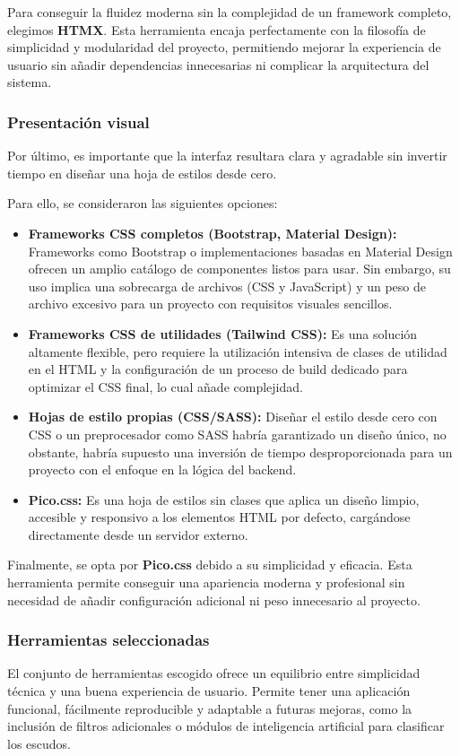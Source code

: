 Para conseguir la fluidez moderna sin la complejidad de un framework completo, elegimos \textbf{HTMX}. Esta herramienta 
encaja perfectamente con la filosofía de simplicidad y modularidad del proyecto, permitiendo mejorar la 
experiencia de usuario sin añadir dependencias innecesarias ni complicar la arquitectura del sistema.

\subsubsection{Presentación visual}
Por último, es importante que la interfaz resultara clara y agradable sin invertir tiempo en diseñar una 
hoja de estilos desde cero.  

Para ello, se consideraron las siguientes opciones:

\begin{itemize} 
    \item \textbf{Frameworks CSS completos (Bootstrap, Material Design):} Frameworks como Bootstrap o 
    implementaciones basadas en Material Design ofrecen un amplio catálogo de componentes listos para 
    usar. Sin embargo, su uso implica una sobrecarga de archivos (CSS y JavaScript) y un peso de 
    archivo excesivo para un proyecto con requisitos visuales sencillos. 
    \item \textbf{Frameworks CSS de utilidades (Tailwind CSS):} Es una solución altamente flexible, pero
    requiere la utilización intensiva de clases de utilidad en el HTML y la configuración de un proceso de build
    dedicado para optimizar el CSS final, lo cual añade complejidad. 
    \item \textbf{Hojas de estilo propias (CSS/SASS):} Diseñar el estilo desde cero con CSS o un 
    preprocesador como SASS habría garantizado un diseño único, no obstante, habría supuesto una inversión de 
    tiempo desproporcionada para un proyecto con el enfoque en la lógica del backend. 
    \item \textbf{Pico.css:} Es una hoja de estilos sin clases que aplica un diseño limpio, accesible y 
    responsivo a los elementos HTML por defecto, cargándose directamente desde un servidor externo. 
\end{itemize}

Finalmente, se opta por \textbf{Pico.css} debido a su simplicidad y eficacia. Esta herramienta permite
conseguir una apariencia moderna y profesional sin necesidad de añadir configuración adicional ni peso
innecesario al proyecto.

\subsubsection{Herramientas seleccionadas}
El conjunto de herramientas escogido ofrece un equilibrio entre simplicidad técnica y una buena experiencia de usuario. 
Permite tener una aplicación funcional, fácilmente reproducible y adaptable a futuras mejoras, como la inclusión de 
filtros adicionales o módulos de inteligencia artificial para clasificar los escudos.